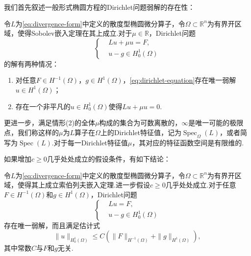 我们首先叙述一般形式椭圆方程的Dirichlet问题弱解的存在性：
\begin{theorem}\label{thm:weak-solution}
令$L$为\eqref{eq:divergence-form}中定义的散度型椭圆微分算子，令$\Omega\subset\mathbb{R}^n$为有界开区域，使得Sobolev嵌入定理在其上成立.对于$\mu\in\mathbb{R}$，Dirichlet问题
\begin{equation}\label{eq:dirichlet-equation}
\left\{\begin{aligned}
& Lu+\mu u = F,\\
& u-g\in H_0^1(\Omega)\end{aligned}\right.
\end{equation}
的解有两种情况：
\begin{enumerate}[(1)]
\item 对任意$F\in H^{-1}(\Omega)$，$g\in H^{1}(\Omega)$，\eqref{eq:dirichlet-equation}存在唯一弱解$u\in H^1(\Omega)$；
\item 存在一个非平凡的$u\in H^1_0(\Omega)$使得$Lu+\mu u=0$.
\end{enumerate}
更进一步，满足情形(2)的全体$\mu$构成的集合为可数离散的，$\infty$是唯一可能的极限点，我们称这样的$\mu$为$L$算子在$\Omega$上的Dirichlet特征值，记为$\operatorname{Spec}_{\Omega}(L)$，或者简写为$\operatorname{Spec}(L)$.对于每一Dirichlet特征值$\mu$，其对应的特征函数空间是有限维的.
\end{theorem}

如果增加$c\geq 0$几乎处处成立的假设条件，有如下结论：
\begin{theorem}\label{thm:regularity}
令$L$为\eqref{eq:divergence-form}中定义的散度型椭圆微分算子，令$\Omega\subset\mathbb{R}^n$为有界开区域，使得其上成立索伯列夫嵌入定理.进一步假设$c\geq 0$几乎处处成立.对于任意$F\in H^{-1}(\Omega)$和$g\in H^1(\Omega)$，Dirichlet问题
\begin{equation}
\left\{\begin{aligned}
&Lu = F, \\
& u-g\in H^{1}_{0}(\Omega)
\end{aligned}\right.
\end{equation}
存在唯一弱解，而且满足估计式
\begin{equation}
\|u\|_{H^1_0(\Omega)} \leq C\left(\|F\|_{H^{-1}(\Omega)} +\|g\|_{H^1(\Omega)} \right),
\end{equation}
其中常数$C$与$F$和$g$无关.
\end{theorem}

